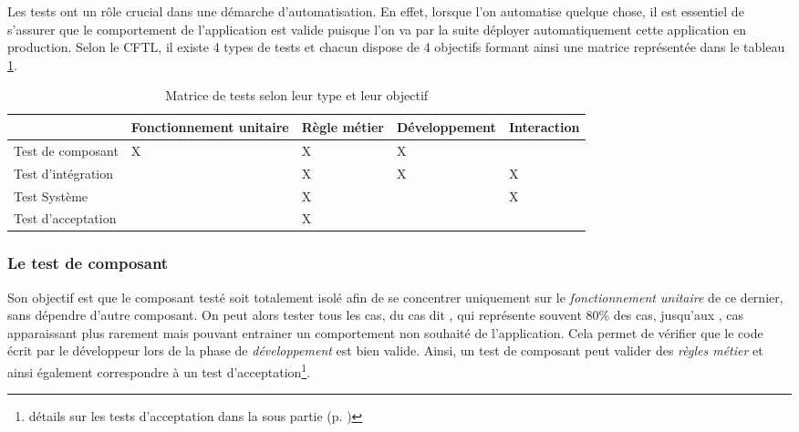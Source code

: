Les tests ont un rôle crucial dans une démarche d'automatisation. En effet, lorsque l'on automatise quelque chose, il est essentiel de s'assurer que le comportement de l'application est valide puisque l'on va par la suite déployer automatiquement cette application en production. Selon le \gls{CFTL}, il existe 4 types de tests et chacun dispose de 4 objectifs formant ainsi une matrice représentée dans le tableau \ref{tab:matrice-test}.

\begin{table}[H]
	\centering
	\begin{adjustbox}{width=0.95\textwidth,center=\textwidth} 
		\begin{tabular}{|l|l|l|l|l|}
			\hline
			\diagbox{type de test}{valide} & Fonctionnement unitaire & Règle métier & Développement & Interaction \\ \hline
			Test de composant     & X                       & X            & X              &             \\ \hline
			Test d'intégration    &                         & X            & X              & X           \\ \hline
			Test Système          &                         & X            &               & X           \\ \hline
			Test d'acceptation    &                         & X            &               &             \\ \hline
		\end{tabular}
	\end{adjustbox}
	\caption{Matrice de tests selon leur type et leur objectif}
	\label{tab:matrice-test}
\end{table}

\subsubsection{Le test de composant}\label{test-composant}

Son objectif est que le composant testé soit totalement isolé afin de se concentrer uniquement sur le \emph{fonctionnement unitaire} de ce dernier, sans dépendre d'autre composant. On peut alors tester tous les cas, du cas dit , qui représente souvent 80\% des cas, jusqu'aux , cas apparaissant plus rarement mais pouvant entrainer un comportement non souhaité de l'application. Cela permet de vérifier que le code écrit par le développeur lors de la phase de \emph{développement} est bien valide. Ainsi, un test de composant peut valider des \emph{règles métier} et ainsi également correspondre à un test d'acceptation\footnote{détails sur les tests d'acceptation dans la sous partie  (p. \pageref{test-acceptation})}.

